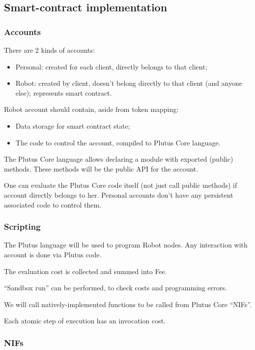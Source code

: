 \subsection{Smart-contract implementation}

\subsubsection{Accounts}

There are 2 kinds of accounts:
\begin{itemize}
  \item Personal: created for each client, directly belongs to that client;
  \item Robot: created by client, doesn't belong directly to that client (and anyone else); represents smart contract.
\end{itemize}

Robot account should contain, aside from token mapping:
\begin{itemize}
  \item Data storage for smart contract state;
  \item The code to control the account, compiled to Plutus Core language.
\end{itemize}

The Plutus Core language allows declaring a module with exported (public) methods.
These methods will be the public API for the account.

One can evaluate the Plutus Core code itself (not just call public methods) if account directly belongs to her.
Personal accounts don't have any persistent associated code to control them.

\subsubsection{Scripting}

The Plutus language will be used to program Robot nodes.
Any interaction with account is done via Plutus code.

The evaluation cost is collected and summed into Fee.

``Sandbox run'' can be performed, to check costs and programming errors.

We will call natively-implemented functions to be called from Plutus Core ``NIFs''.

Each atomic step of execution has an invocation cost.

\subsubsection{NIFs}

